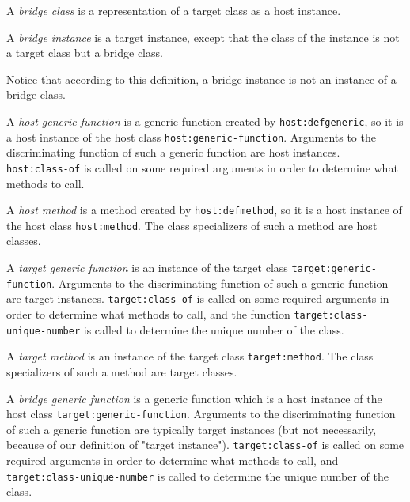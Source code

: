 \begin{definition}
A \emph{bridge class} is a representation of a target class as a host
instance.
\end{definition}

\begin{definition}
A \emph{bridge instance} is a target instance, except that the class of
the instance is not a target class but a bridge class.
\end{definition}

Notice that according to this definition, a bridge instance is not an
instance of a bridge class.

\begin{definition}
A \emph{host generic function} is a generic function created by
\texttt{host:defgeneric}, so it is a host instance of the host class
\texttt{host:generic-function}.  Arguments to the discriminating
function of such a generic function are host instances.
\texttt{host:class-of} is called on some required arguments in order
to determine what methods to call.
\end{definition}

\begin{definition}
A \emph{host method} is a method created by \texttt{host:defmethod},
so it is a host instance of the host class \texttt{host:method}.  The
class specializers of such a method are host classes.
\end{definition}

\begin{definition}
A \emph{target generic function} is an instance of the target class
\texttt{target:generic-function}.  Arguments to the discriminating
function of such a generic function are target instances.
\texttt{target:class-of} is called on some required arguments in order
to determine what methods to call, and the function
\texttt{target:class-unique-number} is called to determine the unique
number of the class.
\end{definition}

\begin{definition}
A \emph{target method} is an instance of the target class
\texttt{target:method}.  The class specializers of such a method are
target classes.
\end{definition}

\begin{definition}
A \emph{bridge generic function} is a generic function which is a host
instance of the host class \texttt{target:generic-function}.  Arguments to
the discriminating function of such a generic function are
typically target instances (but not necessarily, because of our
definition of "target instance").  \texttt{target:class-of} is called on
some required arguments in order to determine what methods to
call, and \texttt{target:class-unique-number} is called to determine the
unique number of the class.
\end{definition}

